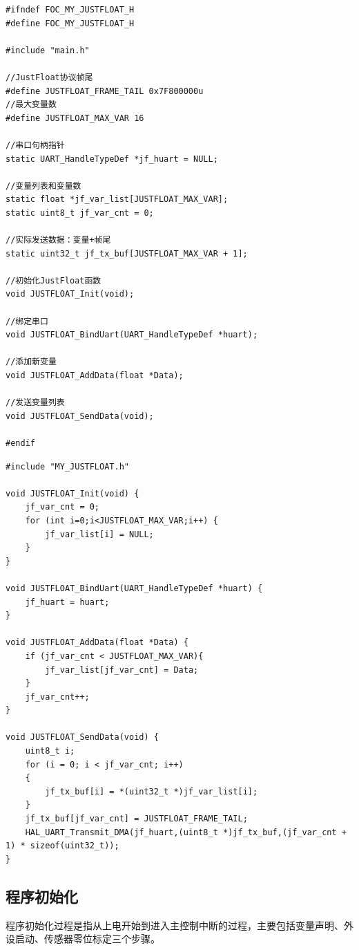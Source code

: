 \begin{lstlisting}
#ifndef FOC_MY_JUSTFLOAT_H
#define FOC_MY_JUSTFLOAT_H

#include "main.h"

//JustFloat协议帧尾
#define JUSTFLOAT_FRAME_TAIL 0x7F800000u
//最大变量数
#define JUSTFLOAT_MAX_VAR 16

//串口句柄指针
static UART_HandleTypeDef *jf_huart = NULL;

//变量列表和变量数
static float *jf_var_list[JUSTFLOAT_MAX_VAR];
static uint8_t jf_var_cnt = 0;

//实际发送数据：变量+帧尾
static uint32_t jf_tx_buf[JUSTFLOAT_MAX_VAR + 1];

//初始化JustFloat函数
void JUSTFLOAT_Init(void);

//绑定串口
void JUSTFLOAT_BindUart(UART_HandleTypeDef *huart);

//添加新变量
void JUSTFLOAT_AddData(float *Data);

//发送变量列表
void JUSTFLOAT_SendData(void);

#endif

\end{lstlisting}

\begin{lstlisting}
#include "MY_JUSTFLOAT.h"

void JUSTFLOAT_Init(void) {
    jf_var_cnt = 0;
    for (int i=0;i<JUSTFLOAT_MAX_VAR;i++) {
        jf_var_list[i] = NULL;
    }
}

void JUSTFLOAT_BindUart(UART_HandleTypeDef *huart) {
    jf_huart = huart;
}

void JUSTFLOAT_AddData(float *Data) {
    if (jf_var_cnt < JUSTFLOAT_MAX_VAR){
        jf_var_list[jf_var_cnt] = Data;
    }
    jf_var_cnt++;
}

void JUSTFLOAT_SendData(void) {
    uint8_t i;
    for (i = 0; i < jf_var_cnt; i++)
    {
        jf_tx_buf[i] = *(uint32_t *)jf_var_list[i];
    }
    jf_tx_buf[jf_var_cnt] = JUSTFLOAT_FRAME_TAIL;
    HAL_UART_Transmit_DMA(jf_huart,(uint8_t *)jf_tx_buf,(jf_var_cnt + 1) * sizeof(uint32_t));
}
\end{lstlisting}

\subsection{程序初始化}
程序初始化过程是指从上电开始到进入主控制中断的过程，主要包括变量声明、外设启动、传感器零位标定三个步骤。

